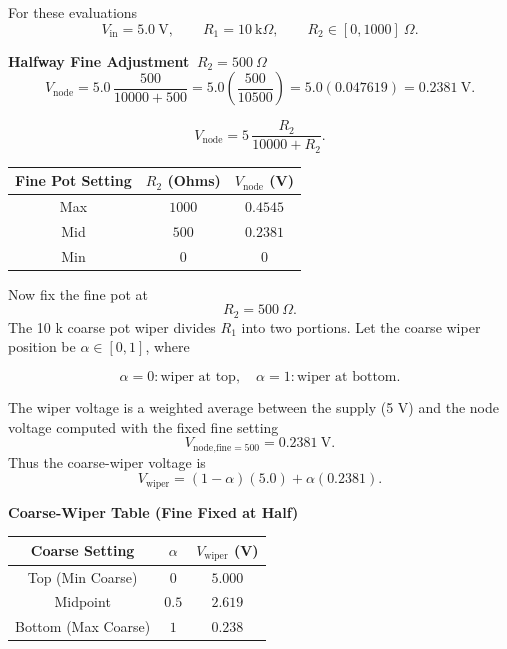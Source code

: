 For these evaluations
\begin{equation}
V_{\text{in}} = 5.0~\text{V}, \qquad
R_{1}=10~\text{k}\Omega, \qquad
R_{2} \in [0,1000]~\Omega.
\end{equation}

\textbf{Halfway Fine Adjustment \(\,R_{2}=500~\Omega\)}
\begin{equation}
V_{\text{node}} 
= 5.0\,
\frac{500}{10000 + 500}
= 5.0 \left( \frac{500}{10500} \right)
= 5.0 (0.047619)
= 0.2381~\text{V}.
\end{equation}

\begin{equation}
V_{\text{node}} = 5\,
\frac{R_{2}}{10000 + R_{2}}.
\end{equation}

\begin{center}
	\begin{tabular}{c|c|c}
		\hline
		Fine Pot Setting & $R_{2}$ (Ohms) & $V_{\text{node}}$ (V) \\
		\hline
		Max & $1000$ & $0.4545$ \\
		Mid & $500$  & $0.2381$ \\
		Min & $0$    & $0$ \\
		\hline
	\end{tabular}
\end{center}

Now fix the fine pot at
\begin{equation}
R_{2}=500~\Omega.
\end{equation}
The 10 k coarse pot wiper divides $R_{1}$ into two portions.  
Let the coarse wiper position be $\alpha\in[0,1]$, where

\begin{equation}
\alpha = 0 : \text{wiper at top}, \quad
\alpha = 1 : \text{wiper at bottom}.
\end{equation}

The wiper voltage is a weighted average between the supply (5 V)  
and the node voltage computed with the fixed fine setting
\begin{equation}
V_{\text{node,fine}=500}
= 0.2381~\text{V}.
\end{equation}
Thus the coarse-wiper voltage is
\begin{equation}
V_{\text{wiper}} = (1-\alpha)(5.0) + \alpha (0.2381).
\end{equation}

\textbf{Coarse-Wiper Table (Fine Fixed at Half)}
\begin{center}
	\begin{tabular}{c|c|c}
		\hline
		Coarse Setting & $\alpha$ & $V_{\text{wiper}}$ (V) \\
		\hline
		Top (Min Coarse)    & $0$   & $5.000$ \\
		Midpoint            & $0.5$ & $2.619$ \\
		Bottom (Max Coarse) & $1$   & $0.238$ \\
		\hline
	\end{tabular}
\end{center}

